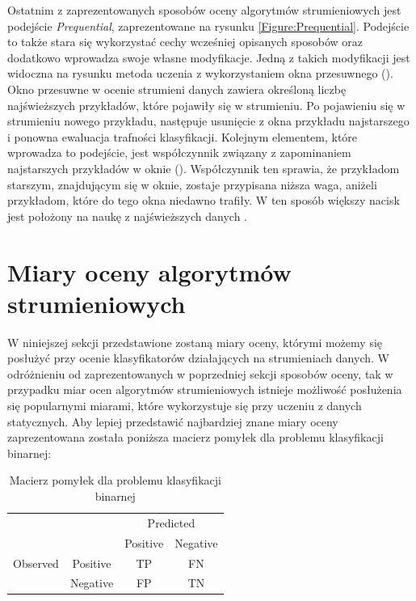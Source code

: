 \noindent Ostatnim z zaprezentowanych sposobów oceny algorytmów strumieniowych jest podejście \textit{Prequential}, zaprezentowane na rysunku \ref{Figure:Prequential}. Podejście to także stara się wykorzystać cechy wcześniej opisanych sposobów oraz dodatkowo wprowadza swoje własne modyfikacje. Jedną z takich modyfikacji jest widoczna na rysunku metoda uczenia z wykorzystaniem okna przesuwnego (). Okno przesuwne w ocenie strumieni danych zawiera określoną liczbę najświeższych przykładów, które pojawiły się w strumieniu. Po pojawieniu się w strumieniu nowego przykładu, następuje usunięcie z okna przykładu najstarszego i ponowna ewaluacja trafności klasyfikacji. Kolejnym elementem, które wprowadza to podejście, jest współczynnik związany z zapominaniem najstarszych przykładów w oknie (). Współczynnik ten sprawia, że przykładom starszym, znajdującym się w oknie, zostaje przypisana niższa waga, aniżeli przykładom, które do tego okna niedawno trafiły. W ten sposób większy nacisk jest położony na naukę z najświeższych danych \cite{Article:Evaluation}.

\section{Miary oceny algorytmów strumieniowych}

\noindent W niniejszej sekcji przedstawione zostaną miary oceny, którymi możemy się posłużyć przy ocenie klasyfikatorów działających na strumieniach danych. W odróżnieniu od zaprezentowanych w poprzedniej sekcji sposobów oceny, tak w przypadku miar ocen algorytmów strumieniowych istnieje możliwość posłużenia się popularnymi miarami, które wykorzystuje się przy uczeniu z danych statycznych. Aby lepiej przedstawić najbardziej znane miary oceny zaprezentowana została poniższa macierz pomyłek dla problemu klasyfikacji binarnej:

\begin{center}
\begin{table}[h]
\renewcommand{\arraystretch}{1.5}
\label{tab:macierz}
\begin{center}
\begin{tabular}{|c|c|c|c|}
   \cline{3-4} 
   \multicolumn{1}{c}{} & & \multicolumn{2}{c|}{Predicted} \\ \cline{3-4}
   \multicolumn{1}{c}{} & & Positive & Negative \\ \hline
   
   {Observed}
   & Positive & TP & FN \\ \cline{2-4}
   & Negative & FP & TN  \\ \cline{2-4} \hline
\end{tabular}
\caption{Macierz pomyłek dla problemu klasyfikacji binarnej}
\end{center}
\end{table}
\end{center}

